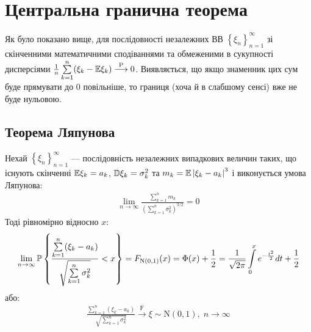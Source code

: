 \section{Центральна гранична теорема}
Як було показано вище, для послідовності незалежних ВВ 
$\left\{ \xi_n\right\}_{n=1}^\infty$ зі скінченними математичними сподіваннями та обмеженими в сукупності
дисперсіями $\frac{1}{n}\sum\limits_{k=1}^n (\xi_k - \E\xi_k) \overset{\mathrm{P}}{\longrightarrow} 0$.
Виявляється, що якщо знаменник цих сум буде прямувати до $0$ повільніше, то границя (хоча й в слабшому сенсі) вже не буде нульовою.
\subsection{Теорема Ляпунова}
\begin{theorem*}\label{CLT}
    Нехай $\left\{ \xi_n\right\}_{n=1}^\infty$ --- послідовність незалежних випадкових величин таких, 
    що існують скінченні $\E\xi_k = a_k$, $\D\xi_k = \sigma_k^2$ та
    $m_k = \E\left|\xi_k - a_k\right|^3$ і виконується умова Ляпунова: 
    \begin{gather*}
        \lim_{n \rightarrow \infty} \frac{\sum\limits_{k=1}^n m_k}{\left(
            \sum\limits_{k=1}^n \sigma_k^2
        \right)^{3/2}} = 0
    \end{gather*}
    Тоді рівномірно відносно $x$:
    \begin{gather}
        \lim_{n \rightarrow \infty} \P \left\{
            \frac{\sum\limits_{k=1}^n (\xi_k - a_k)}
            {\sqrt{\sum\limits_{k=1}^n \sigma_k^2}}
            < x
        \right\} = F_{\mathrm{N}(0, 1)}(x) = \Phi(x) + \frac{1}{2} = 
        \frac{1}{\sqrt{2\pi}} \int\limits_0^x e^{-\frac{t^2}{2}} dt + \frac{1}{2}
    \end{gather}
    або:
    \begin{gather*}
        \frac{\sum\limits_{k=1}^n (\xi_k - a_k)}
        {\sqrt{\sum\limits_{k=1}^n \sigma_k^2}}
        \overset{\mathrm{F}}{\longrightarrow} \xi \sim \mathrm{N}(0, 1),  \; n\to \infty
    \end{gather*}
\end{theorem*}
